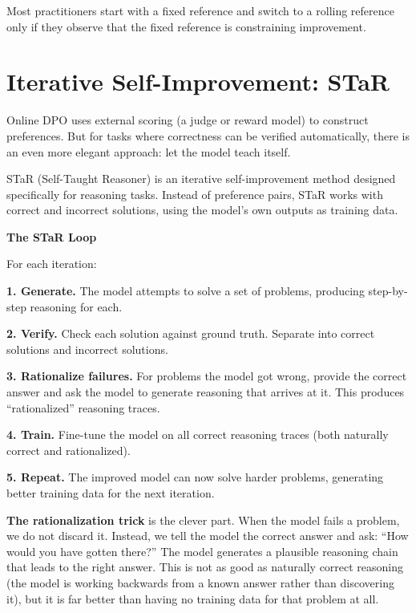 \begin{chapterenv}
Most practitioners start with a fixed reference and switch to a rolling reference only if they observe that the fixed reference is constraining improvement.

\section{Iterative Self-Improvement: STaR}

Online DPO uses external scoring (a judge or reward model) to construct preferences. But for tasks where correctness can be verified automatically, there is an even more elegant approach: let the model teach itself.

STaR (Self-Taught Reasoner) is an iterative self-improvement method designed specifically for reasoning tasks. Instead of preference pairs, STaR works with correct and incorrect solutions, using the model's own outputs as training data.

\begin{infobox}
\textbf{The STaR Loop}

For each iteration:

\textbf{1. Generate.} The model attempts to solve a set of problems, producing step-by-step reasoning for each.

\textbf{2. Verify.} Check each solution against ground truth. Separate into correct solutions and incorrect solutions.

\textbf{3. Rationalize failures.} For problems the model got wrong, provide the correct answer and ask the model to generate reasoning that arrives at it. This produces ``rationalized'' reasoning traces.

\textbf{4. Train.} Fine-tune the model on all correct reasoning traces (both naturally correct and rationalized).

\textbf{5. Repeat.} The improved model can now solve harder problems, generating better training data for the next iteration.
\end{infobox}

\textbf{The rationalization trick} is the clever part. When the model fails a problem, we do not discard it. Instead, we tell the model the correct answer and ask: ``How would you have gotten there?'' The model generates a plausible reasoning chain that leads to the right answer. This is not as good as naturally correct reasoning (the model is working backwards from a known answer rather than discovering it), but it is far better than having no training data for that problem at all.


\end{chapterenv}
